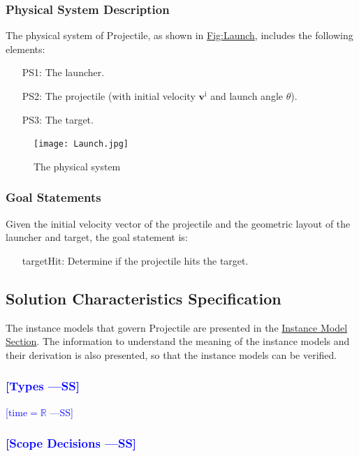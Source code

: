 \documentclass[12pt]{article}
\newcommand{\authornote}[3]{\textcolor{#1}{[#3 ---#2]}}
\newcommand{\authornote}[3]{}
\newcommand{\wss}[1]{\authornote{blue}{SS}{#1}}
\begin{document}
\subsubsection{Physical System Description}
\label{Sec:PhysSyst}
The physical system of Projectile, as shown in \hyperref[Figure:Launch]{Fig:Launch}, includes the following elements:

\begin{itemize}
\item[PS1:]{The launcher.}
\item[PS2:]{The projectile (with initial velocity ${\symbf{v}^{\text{i}}}$ and launch angle $θ$).}
\item[PS3:]{The target.}
\end{itemize}
\begin{figure}
\begin{center}
\texttt{[image: Launch.jpg]}
\caption{The physical system}
\label{Figure:Launch}
\end{center}
\end{figure}
\subsubsection{Goal Statements}
\label{Sec:GoalStmt}
Given the initial velocity vector of the projectile and the geometric layout of the launcher and target, the goal statement is:

\begin{itemize} \item[targetHit:\phantomsection\label{targetHit}]{Determine if
the projectile hits the target.} \end{itemize} \subsection{Solution
Characteristics Specification} \label{Sec:SolCharSpec} The instance models that
govern Projectile are presented in the \hyperref[Sec:IMs]{Instance Model
Section}. The information to understand the meaning of the instance models and
their derivation is also presented, so that the instance models can be verified.

\subsubsection{\wss{Types}}

\wss{$\text{time} = \mathbb{R}$} 

\subsubsection{\wss{Scope Decisions}}
\label{Sec:ScopeDec} 
\end{document}
